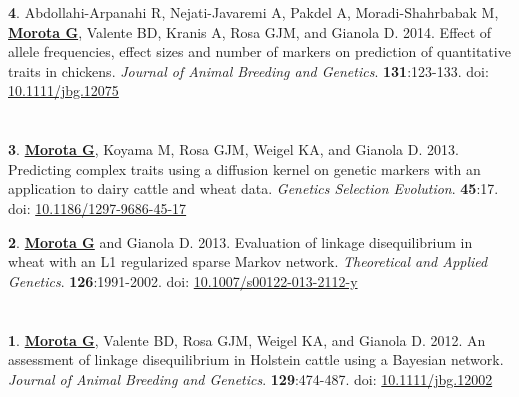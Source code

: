 \documentclass[margin,line,10pt]{res}
\newenvironment{list1}{
  \begin{list}{\ding{113}}{%
      \setlength{\itemsep}{0in}
      \setlength{\parsep}{0in} \setlength{\parskip}{0in}
      \setlength{\topsep}{0in} \setlength{\partopsep}{0in} 
      \setlength{\leftmargin}{0.17in}}}{\end{list}}
\begin{document}
\begin{resume}
\begin{list1}
\item [{\bf 4}.]  Abdollahi-Arpanahi R,  Nejati-Javaremi A,  Pakdel A, Moradi-Shahrbabak M, 
     {\bf \underline{Morota G}}, Valente BD, Kranis A, Rosa GJM, and Gianola D. 2014.   
     Effect of allele frequencies, effect sizes and number of markers on prediction of quantitative 
     traits in chickens. \emph{Journal of Animal Breeding and Genetics}. \textbf{131}:123-133. doi: \textcolor{blue}{\href{http://dx.doi.org/10.1111/jbg.12075}{10.1111/jbg.12075}}
\end{list1}



\section{}


\begin{list1}
\item [{\bf 3}.]  {\bf \underline{Morota G}}, Koyama M, Rosa GJM, Weigel KA, and Gianola D. 2013.
     Predicting complex traits using a diffusion kernel on genetic markers with an application to dairy cattle and wheat data. \emph{Genetics Selection Evolution}. {\bf 45}:17. doi: \textcolor{blue}{\href{http://dx.doi.org/10.1186/1297-9686-45-17}{10.1186/1297-9686-45-17}}

\vspace{0.5cm}

\item [{\bf 2}.] {\bf \underline{Morota G}} and Gianola D. 2013.  Evaluation of linkage disequilibrium in wheat with an L1 regularized sparse Markov network.
  \emph{Theoretical and Applied Genetics}. {\bf 126}:1991-2002. doi: \textcolor{blue}{\href{http://dx.doi.org/10.1007/s00122-013-2112-y}{10.1007/s00122-013-2112-y}}
\end{list1}


\section{}
\begin{list1} 
\item [{\bf 1}.] {\bf \underline{Morota G}}, Valente BD, Rosa GJM, Weigel KA, and Gianola D. 2012.  
An assessment of linkage disequilibrium in Holstein cattle using a Bayesian network. \emph{Journal of Animal Breeding and Genetics}. {\bf 129}:474-487. doi: \textcolor{blue}{\href{http://dx.doi.org/10.1111/jbg.12002}{10.1111/jbg.12002}}
\end{list1}






\end{resume}
\end{document}
